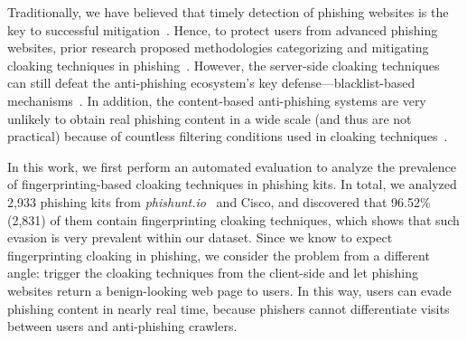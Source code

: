 Traditionally, we have believed that timely detection of phishing websites is the key to successful mitigation~\cite{oest2020sunrise, zhang2021crawlphish}.
Hence, to protect users from advanced phishing websites, prior research proposed methodologies categorizing and mitigating cloaking techniques in phishing~\cite{oest2018inside, oest2019phishfarm, zhang2021crawlphish}.
However, the server-side cloaking techniques can still defeat the anti-phishing ecosystem's key defense---blacklist-based mechanisms~\cite{oest2019phishfarm}.
In addition, the content-based anti-phishing systems are very unlikely to obtain real phishing content in a wide scale (and thus are not practical) because of countless filtering conditions used in cloaking techniques~\cite{oest2018inside, oest2020phishtime}.


In this work, we first perform an automated evaluation to analyze the prevalence of fingerprinting-based cloaking techniques in phishing kits.
In total, we analyzed 2,933 phishing kits from \emph{phishunt.io}~\cite{phishunt} and Cisco, and discovered that 96.52\% (2,831) of them contain fingerprinting cloaking techniques, which shows that such evasion is very prevalent within our dataset.
Since we know to expect fingerprinting cloaking in phishing, we consider the problem from a different angle:
trigger the cloaking techniques from the client-side and let phishing websites return a benign-looking web page to users.
In this way, users can evade phishing content in nearly real time,
because phishers cannot differentiate visits between users and anti-phishing crawlers.

